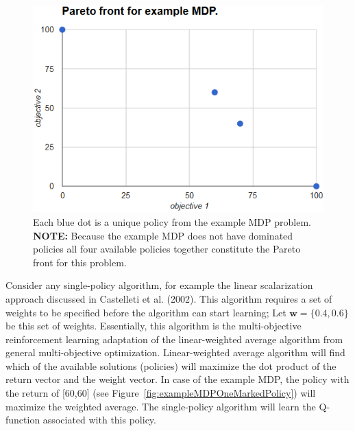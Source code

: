 \begin{figure}[ht]
\centering
\includegraphics[scale=0.6]{exampleMDPFront.png}
\caption{Each blue dot is a unique policy from the example MDP problem. \textbf{NOTE:} Because the example MDP does not have dominated policies all four available policies together constitute the Pareto front for this problem.}
\label{fig:exampleMDPFront}
\end{figure}

Consider any single-policy algorithm, for example the linear scalarization approach discussed in Castelleti et al. (2002)\nocite{castelletti2002reinforcement}. This algorithm requires a set of weights to be specified before the algorithm can start learning; Let $ \textbf{w} = \{0.4,0.6\} $ be this set of weights. Essentially, this algorithm is the multi-objective reinforcement learning adaptation of the linear-weighted average algorithm from general multi-objective optimization. Linear-weighted average algorithm will find which of the available solutions (policies) will maximize the dot product of the return vector and the weight vector. In case of the example MDP, the policy with the return of [60,60] (see Figure~\ref{fig:exampleMDPOneMarkedPolicy}) will maximize the weighted average. The single-policy algorithm will learn the Q-function associated with this policy.

